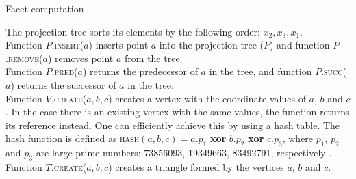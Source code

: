 \begin{algorithm}[h]
\begin{algorithmic}[1]
		\EndFunction
	\end{algorithmic}
	\caption{Facet computation}
	\label{alg:facet_computation}
	\algrule[1pt]
	\small The projection tree sorts its elements by the following order: $x_2,x_3,x_1$.\\Function $P$.\textsc{insert}($a$) inserts point $a$ into the projection tree ($P$) and function $P$.\textsc{remove}($a$) removes point $a$ from the tree.\\Function $P$.\textsc{pred}($a$) returns the predecessor of $a$ in the tree, and function $P$.\textsc{succ}($a$) returns the successor of $a$ in the tree.\\Function $V$.\textsc{create}($a,b,c$) creates a vertex with the coordinate values of $a$, $b$ and $c$. In the case there is an existing vertex with the same values, the function returns its reference instead. One can efficiently achieve this by using a hash table. The hash function is defined as \textsc{hash}$(a,b,c) = a.p_1$ \textbf{xor} $b.p_2$ \textbf{xor} $c.p_3$, where $p_1$, $p_2$ and $p_3$ are large prime numbers: 73856093, 19349663, 83492791, respectively \cite{teschner_hash}.\\Function $T$.\textsc{create}($a,b,c$) creates a triangle formed by the vertices $a$, $b$ and $c$.
\end{algorithm}
